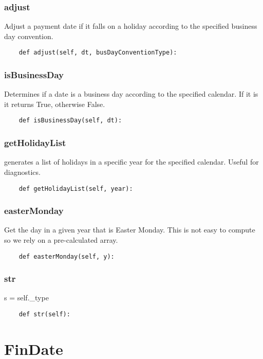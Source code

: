 \documentclass[twoside,11pt]{book}
\begin{document}
\subsubsection*{{\bf adjust}}
Adjust a payment date if it falls on a holiday according to the specified business day convention.  

\begin{lstlisting}
    def adjust(self, dt, busDayConventionType):
\end{lstlisting}

\subsubsection*{{\bf isBusinessDay}}
Determines if a date is a business day according to the specified calendar. If it is it returns True, otherwise False.  

\begin{lstlisting}
    def isBusinessDay(self, dt):
\end{lstlisting}

\subsubsection*{{\bf getHolidayList}}
generates a list of holidays in a specific year for the specified calendar. Useful for diagnostics.  

\begin{lstlisting}
    def getHolidayList(self, year):
\end{lstlisting}

\subsubsection*{{\bf easterMonday}}
Get the day in a given year that is Easter Monday. This is not easy to compute so we rely on a pre-calculated array.  

\begin{lstlisting}
    def easterMonday(self, y):
\end{lstlisting}

\subsubsection*{{\bf str}}
s = self.\_type 

\begin{lstlisting}
    def str(self):
\end{lstlisting}

\newpage
\section{FinDate}
\end{document}

